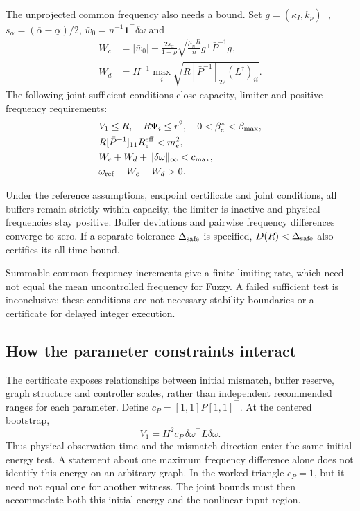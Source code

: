 The unprojected common frequency also needs a bound. Set
$g=(\kappa_I,k_p)^\top$,
$s_\alpha=(\overline\alpha-\underline\alpha)/2$,
$\bar w_0=n^{-1}\mathbf1^\top\delta\omega$ and
\begin{align}
 W_c&=|\bar w_0|+\frac{2s_\alpha}{1-\rho}
       \sqrt{\frac{\mu_nR}{n}g^\top\bar P^{-1}g},\nonumber\\
 W_d&=H^{-1}\max_i\sqrt{R[\bar P^{-1}]_{22}(L^\dagger)_{ii}}.
\end{align}
The following joint sufficient conditions close capacity, limiter
and positive-frequency requirements:
\begin{align}
 &V_1\le R,\quad R\Psi_i\le r^2,\quad 0<\beta_e^*<\beta_{\max},\nonumber\\
 &R[\bar P^{-1}]_{11}R_e^{\rm eff}<m_e^2,\nonumber\\
 &W_c+W_d+\|\delta\omega\|_\infty<c_{\max},\nonumber\\
 &\omega_{\rm ref}-W_c-W_d>0.
 \label{eq:btd_joint_sufficient_conditions}
\end{align}
\begin{btdcorollary}
\label{cor:btd_buffer_safety}
Under the reference assumptions, endpoint certificate and joint
conditions, all buffers remain strictly within capacity, the limiter
is inactive and physical frequencies stay positive. Buffer deviations
and pairwise frequency differences converge to zero. If a separate
tolerance $\Delta_{\rm safe}$ is specified, $D(R)<\Delta_{\rm safe}$
also certifies its all-time bound.
\end{btdcorollary}
Summable common-frequency increments give a finite limiting rate,
which need not equal the mean uncontrolled frequency for Fuzzy. A failed sufficient
test is inconclusive; these conditions are not necessary stability
boundaries or a certificate for delayed integer execution.

\subsection{How the parameter constraints interact}
The certificate exposes relationships between initial mismatch,
buffer reserve, graph structure and controller scales, rather than
independent recommended ranges for each parameter. Define
$c_P=[1,1]\bar P[1,1]^\top$. At the centered bootstrap,
\begin{equation}
 V_1=H^2c_P\,\delta\omega^\top L\delta\omega.
\end{equation}
Thus physical observation time and the mismatch direction enter the
same initial-energy test. A statement about one maximum frequency
difference alone does not identify this energy on an arbitrary graph.
In the worked triangle $c_P=1$, but it need not equal one for another
witness. The joint bounds must then accommodate both this initial
energy and the nonlinear input region.

